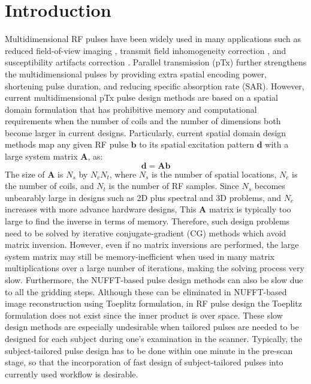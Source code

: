 \section* {Introduction}

\par Multidimensional RF pulses have been widely used in many applications such as reduced field-of-view imaging \cite{rieseberg2002two}, transmit field inhomogeneity correction \cite{saekho2005small}, and susceptibility artifacts correction \cite{stenger2000three}. Parallel transmission (pTx) \cite{katscher2003transmit,zhu2004parallel} further strengthens the multidimensional pulses by providing extra spatial encoding power, shortening pulse duration, and reducing  specific absorption rate (SAR). However, current multidimensional pTx pulse design methods are based on a spatial domain formulation \cite{Grissom:2006:MRM,setsompop2008magnitude} that has prohibitive memory and computational requirements when the number of coils and the number of dimensions both become larger in current designs. 
Particularly, current spatial domain design methods map any given RF pulse $\mathbf{b}$ to its spatial excitation pattern $\mathbf{d}$ with a large system matrix $\mathbf{A}$, as:
\begin{equation*}
	\mathbf{d}=\mathbf{Ab}
\end{equation*}
The size of $\mathbf{A}$ is $N_s$ by $N_cN_t$, where $N_s$ is the number of spatial locations, $N_c$ is the number of coils, and $N_t$ is the number of RF samples. Since $N_s$ becomes unbearably large in designs such as 2D plus spectral and 3D problems, and $N_c$ increases with more advance hardware designs, 
This $\mathbf{A}$ matrix is typically too large to find the inverse in terms of memory. Therefore, such design problems need to be solved by iterative conjugate-gradient (CG) methods which avoid matrix inversion. However, even if no matrix inversions are performed, the large system matrix may still be memory-inefficient when used in many matrix multiplications over a large number of iterations, making the solving process very slow. Furthermore, the NUFFT-based pulse design methods can also be slow due to all the gridding steps. Although these can be eliminated in NUFFT-based image reconstruction using Toeplitz formulation, in RF pulse design the Toeplitz formulation does not exist since the inner product is over space. 
These slow design methods are especially undesirable when tailored pulses are needed to be designed for each subject during one's examination in the scanner. Typically, the subject-tailored pulse design has to be done within one minute in the pre-scan stage, so that the incorporation of fast design of subject-tailored pulses into currently used workflow is desirable.  

